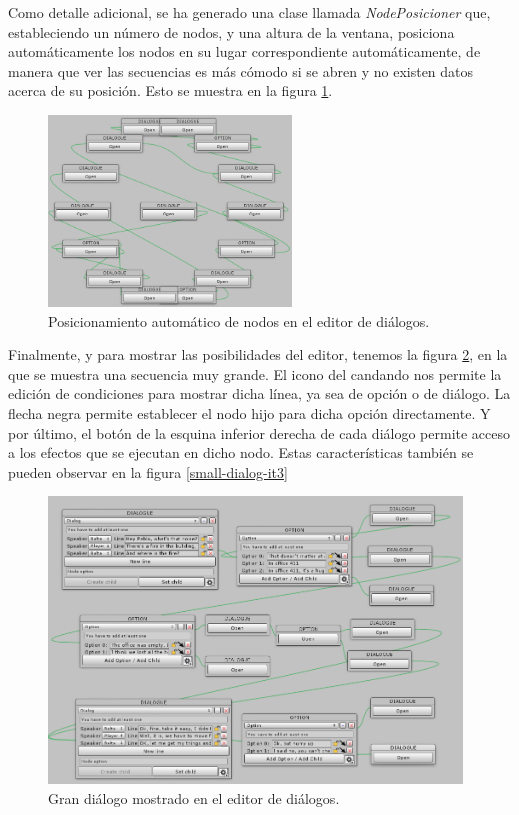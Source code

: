 Como detalle adicional, se ha generado una clase llamada \textit{NodePosicioner} que, estableciendo un número de nodos, y una altura de la ventana, posiciona automáticamente los nodos en su lugar correspondiente automáticamente, de manera que ver las secuencias es más cómodo si se abren y no existen datos acerca de su posición. Esto se muestra en la figura \ref{circle-nodes-it3}.

\begin{figure}[h!]
	\centerline{\includegraphics[height=2in]{figures/it3/nodes-circle.png}}
	\caption[Anillo de nodos - Editor de Diálogos]{Posicionamiento automático de nodos en el editor de diálogos.}
	\label{circle-nodes-it3}
\end{figure}

Finalmente, y para mostrar las posibilidades del editor, tenemos la figura \ref{big-dialog-it3}, en la que se muestra una secuencia muy grande. El icono del candando nos permite la edición de condiciones para mostrar dicha línea, ya sea de opción o de diálogo. La flecha negra permite establecer el nodo hijo para dicha opción directamente. Y por último, el botón de la esquina inferior derecha de cada diálogo permite acceso a los efectos que se ejecutan en dicho nodo. Estas características también se pueden observar en la figura \ref{small-dialog-it3}

\begin{figure}[h!]
	\centerline{\includegraphics[height=3in]{figures/it3/big-dialog.png}}
	\caption[Gran diálogo - Editor de Diálogos]{Gran diálogo mostrado en el editor de diálogos.}
	\label{big-dialog-it3}
\end{figure}

